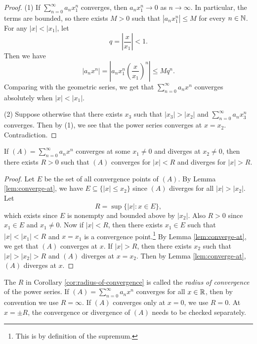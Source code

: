 \begin{proof}
  (1) If $\sum_{n = 0}^\infty a_n x_1^n$ converges, then
  $a_n x_1^n \to 0$ as $n \to \infty$. In particular,
  the terms are bounded, so there exists $M > 0$
  such that $|a_n x_1^n| \le M$ for every $n \in \mathbb{N}$.
  For any $|x| < |x_1|$, let
  \[
    q = \left|\frac{x}{x_1}\right| < 1.
  \]
  Then we have
  \[
    |a_n x^n| = \left|a_n x_1^n \left(\frac{x}{x_1}\right)^n\right|
    \le Mq^n.
  \]
  Comparing with the geometric series, we get that
  $\sum_{n = 0}^\infty a_n x^n$ converges absolutely
  when $|x| < |x_1|$.

  (2) Suppose otherwise that there exists $x_3$ such that
  $|x_3| > |x_2|$ and $\sum_{n = 0}^\infty a_n x_3^n$
  converges. Then by (1), we see that the power series
  converges at $x = x_2$. Contradiction.
\end{proof}

\begin{corollary}
  \label{cor:radius-of-convergence}
  If $(A) = \sum_{n = 0}^\infty a_n x^n$ converges at
  some $x_1 \ne 0$ and diverges at $x_2 \ne 0$, then
  there exists $R > 0$ such that $(A)$ converges
  for $|x| < R$ and diverges for $|x| > R$.
\end{corollary}

\begin{proof}
  Let $E$ be the set of all convergence points of $(A)$.
  By Lemma \ref{lem:converge-at}, we have
  $E \subseteq \{|x| \le x_2\}$ since $(A)$ diverges
  for all $|x| > |x_2|$. Let
  \[R = \sup \{|x| : x \in E\},\]
  which exists since
  $E$ is nonempty and bounded above by $|x_2|$.
  Also $R > 0$ since $x_1 \in E$ and $x_1 \ne 0$. Now if
  $|x| < R$, then
  there exists $x_1 \in E$ such that
  $|x| < |x_1| < R$ and $x = x_1$ is a convergence point.\footnote{This is by definition of the supremum.}
  By Lemma \ref{lem:converge-at}, we get that
  $(A)$ converges at $x$. If $|x| > R$, then there
  exists $x_2$ such that $|x| > |x_2| > R$ and
  $(A)$ diverges at $x = x_2$. Then by Lemma
  \ref{lem:converge-at}, $(A)$ diverges at $x$.
\end{proof}

\begin{remark}
  The $R$ in Corollary \ref{cor:radius-of-convergence}
  is called the \emph{radius of convergence} of the
  power series. If $(A) = \sum_{n = 0}^\infty a_n x^n$
  converges for all $x \in \mathbb{R}$, then by convention
  we use $R = \infty$. If $(A)$ converges only
  at $x = 0$, we use $R = 0$. At $x = \pm R$, the
  convergence or divergence of $(A)$ needs to be checked
  separately.
\end{remark}

